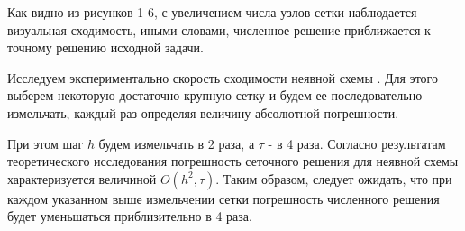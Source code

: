 {{%
%
%

Как видно из рисунков 1-6, с увеличением числа узлов сетки наблюдается визуальная сходимость, иными словами, численное решение приближается к точному решению исходной задачи.

Исследуем экспериментально скорость сходимости неявной схемы . Для
этого выберем некоторую достаточно крупную сетку и будем ее последовательно
измельчать, каждый раз определяя величину абсолютной погрешности. 

При этом шаг $h$ будем измельчать в 2 раза, а $\tau$ - в 4 раза. Согласно результатам
теоретического исследования погрешность сеточного решения для неявной схемы
характеризуется величиной $O(h^2, \tau)$. Таким образом, следует ожидать, что при
каждом указанном выше измельчении сетки погрешность численного решения
будет уменьшаться приблизительно в 4 раза.

%
%		
%		
%		 	

}}
